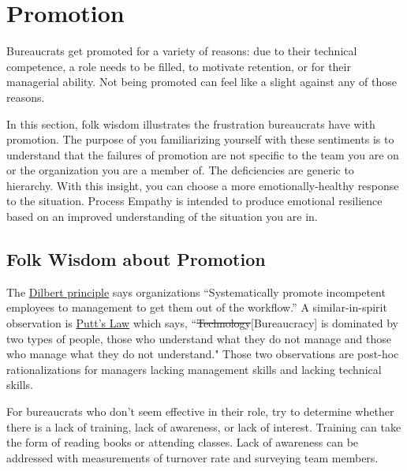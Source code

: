 \section{Promotion\label{sec:promotion}}

Bureaucrats get promoted for a variety of reasons: due to their technical competence, a role needs to be filled, to motivate retention, or for their managerial ability.  Not being promoted can feel like a slight against any of those reasons. 

In this section, folk wisdom illustrates the frustration bureaucrats have with promotion. The purpose of you familiarizing yourself with these sentiments is to understand that the failures of promotion are not specific to the team you are on or the organization you are a member of. The deficiencies are generic to hierarchy. With this insight, you can choose a more emotionally-healthy response to the situation. Process Empathy is intended to produce emotional resilience based on an improved understanding of the situation you are in.

\subsection*{Folk Wisdom about Promotion}

The 
\href{https://en.wikipedia.org/wiki/Dilbert_principle}{Dilbert principle}
says organizations
``Systematically promote incompetent employees to management to get them out of the workflow.''
A similar-in-spirit observation is 
\href{https://en.wikipedia.org/wiki/Putt\%27s_Law_and_the_Successful_Technocrat}{Putt's Law}
which says,
``\sout{Technology}[Bureaucracy] is dominated by two types of people, those who understand what they do not manage and those who manage what they do not understand."
Those two observations are post-hoc rationalizations for managers lacking management skills and lacking technical skills. 

For bureaucrats who don't seem effective in their role, try to determine whether there is a lack of training, lack of awareness, or lack of interest. Training can take the form of reading books or attending classes. Lack of awareness can be addressed with measurements of turnover rate and surveying team members. 




